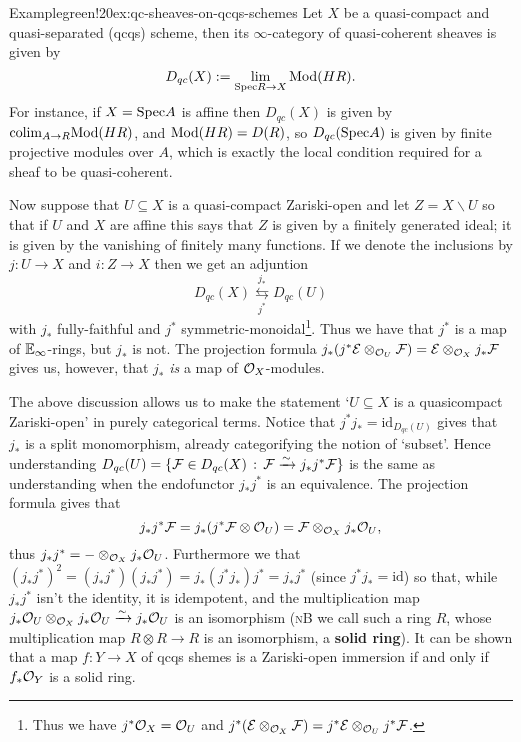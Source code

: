 \begin{env}{Example}{green!20}{ex:qc-sheaves-on-qcqs-schemes}
Let $X$ be a quasi-compact and quasi-separated (qcqs) scheme, then its $\infty$-category of quasi-coherent sheaves is given by 
	\[
		D_{qc}(X) := \lim_{{\text{Spec}} R \to X} {\text{Mod}}(HR).
	\]
	For instance, if $X = {\text{Spec}} A$ is affine then $D_{qc}(X)$ is given by ${\text{colim}}_{A \to R} {\text{Mod}}(HR)$, and ${\text{Mod}}(HR) = D(R)$, so $D_{qc}({\text{Spec}} A)$ is given by finite projective modules over $A$, which is exactly the local condition required for a sheaf to be quasi-coherent.

	Now suppose that $U \subseteq X$ is a quasi-compact Zariski-open and let $Z = X\backslash U$ so that if $U$ and $X$ are affine this says that $Z$ is given by a finitely generated ideal; it is given by the vanishing of finitely many functions.
%
%
If we denote the inclusions by $j : U \to X$ and $i : Z \to X$ then we get an adjuntion
 	\[
		D_{qc}(X) \overset{j_\ast}{\underset{j^\ast}{\leftrightarrows}} D_{qc}(U)
	\]
	with $j_\ast$ fully-faithful and $j^\ast$ symmetric-monoidal\footnote{Thus we have $j^\ast{\mathcal{O}}_X = {\mathcal{O}}_U$ and $j^\ast({\mathcal{E}} \otimes_{{\mathcal{O}}_X} {\mathcal{F}}) = j^\ast{\mathcal{E}} \otimes_{{\mathcal{O}}_U} j^\ast{\mathcal{F}}$.}. Thus we have that $j^\ast$ is a map of $\mathbb{E}_\infty$-rings, but $j_\ast$ is not. The projection formula $j_\ast(j^\ast{\mathcal{E}} \otimes_{{\mathcal{O}}_U} {\mathcal{F}}) = {\mathcal{E}} \otimes_{{\mathcal{O}}_X} j_\ast{\mathcal{F}}$ gives us, however, that $j_\ast$ \textit{is} a map of ${\mathcal{O}}_X$-modules. 

	The above discussion allows us to make the statement `$U \subseteq X$ is a quasicompact Zariski-open' in purely categorical terms. Notice that $j^\ast j_\ast = \text{id}_{D_{qc}(U)}$ gives that $j_\ast$ is a split monomorphism, already categorifying the notion of `subset'. Hence understanding $D_{qc}(U) = \{{\mathcal{F}} \in D_{qc}(X) \,:\, {\mathcal{F}} \xrightarrow{\sim} j_\ast j^\ast{\mathcal{F}}\}$ is the same as understanding when the endofunctor $j_\ast j^\ast$ is an equivalence. The projection formula gives that
	\[
		j_\ast j^\ast {\mathcal{F}}
		= j_\ast(j^\ast{\mathcal{F}} \otimes {\mathcal{O}}_U)
		= {\mathcal{F}} \otimes_{{\mathcal{O}}_X} j_\ast {\mathcal{O}}_U,
	\]
	thus $j_\ast j^\ast = -\otimes_{{\mathcal{O}}_X} j_\ast{\mathcal{O}}_U$. Furthermore we that $(j_\ast j^\ast)^2 = (j_\ast j^\ast)(j_\ast j^\ast) = j_\ast (j^\ast j_\ast) j^\ast = j_\ast j^\ast$ (since $j^\ast j_\ast = \text{id}$) so that, while $j_\ast j^\ast$ isn't the identity, it is idempotent, and the multiplication map $j_\ast{\mathcal{O}}_U \otimes_{{\mathcal{O}}_X} j_\ast{\mathcal{O}}_U \xrightarrow{\sim} j_\ast{\mathcal{O}}_U$ is an isomorphism (\textsc{nB} we call such a ring $R$, whose multiplication map $R \otimes R \to R$ is an isomorphism, a \textbf{solid ring}). It can be shown that a map $f : Y \to X$ of qcqs shemes is a Zariski-open immersion if and only if $f_\ast{\mathcal{O}}_Y$ is a solid ring. 


\end{env}
